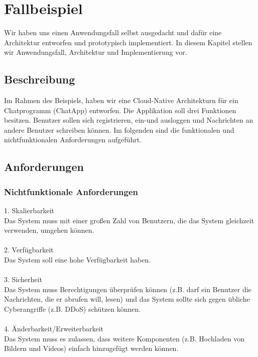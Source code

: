 \chapter{Fallbeispiel}
Wir haben uns einen Anwendungsfall selbst ausgedacht und dafür eine Architektur entworfen und prototypisch implementiert. In diesem Kapitel stellen wir Anwendungsfall, Architektur und Implementierung vor.

\section{Beschreibung}
Im Rahmen des Beispiels, haben wir eine Cloud-Native Architekturn für ein Chatprogramm (ChatApp) entworfen. Die Applikation soll drei Funktionen besitzen. Benutzer sollen sich registrieren, ein-und ausloggen und Nachrichten an andere Benutzer schreiben können. Im folgenden sind die funktionalen und nichtfunktionalen Anforderungen aufgeführt.


\section{Anforderungen}
\subsection{Nichtfunktionale Anforderungen}
1. Skalierbarkeit\\
Das System muss mit einer großen Zahl von Benutzern, die das System gleichzeit verwenden, umgehen können.\\
\\
2. Verfügbarkeit\\
Das System soll eine hohe Verfügbarkeit haben.\\
\\
3. Sicherheit\\
Das System muss Berechtigungen überprüfen können (z.B. darf ein Benutzer die Nachrichten, die er abrufen will, lesen) und das System sollte sich gegen übliche Cyberangriffe (z.B. DDoS) schützen können.\\
\\
4. Änderbarkeit/Erweiterbarkeit\\
Das System muss es zulassen, dass weitere Komponenten (z.B. Hochladen von Bildern und Videos) einfach hinzugefügt werden können.

